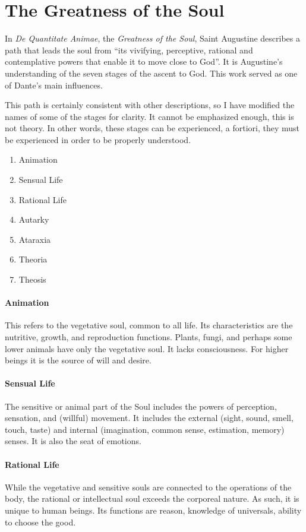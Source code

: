 \section{The Greatness of the Soul}

In \emph{De Quantitate Animae}, the \emph{Greatness of the Soul}, Saint Augustine describes a path that leads the soul from “its vivifying, perceptive, rational and contemplative powers that enable it to move close to God”. It is Augustine's understanding of the seven stages of the ascent to God. This work served as one of Dante's main influences.

This path is certainly consistent with other descriptions, so I have modified the names of some of the stages for clarity. It cannot be emphasized enough, this is not theory. In other words, these stages can be experienced, a fortiori, they must be experienced in order to be properly understood.

\begin{enumerate}
\item Animation 
\item Sensual Life 
\item Rational Life 
\item Autarky 
\item Ataraxia 
\item Theoria 
\item Theosis 
\end{enumerate}
\paragraph{Animation}
This refers to the vegetative soul, common to all life. Its characteristics are the nutritive, growth, and reproduction functions. Plants, fungi, and perhaps some lower animals have only the vegetative soul. It lacks consciousness. For higher beings it is the source of will and desire.

\paragraph{Sensual Life}
The sensitive or animal part of the Soul includes the powers of perception, sensation, and (willful) movement. It includes the external (sight, sound, smell, touch, taste) and internal (imagination, common sense, estimation, memory) senses. It is also the seat of emotions.

\paragraph{Rational Life}
While the vegetative and sensitive souls are connected to the operations of the body, the rational or intellectual soul exceeds the corporeal nature. As such, it is unique to human beings. Its functions are reason, knowledge of universals, ability to choose the good.

